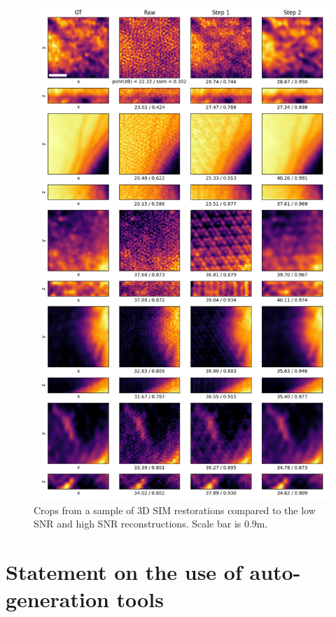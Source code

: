 \documentclass[12pt]{article}
\begin{document}
\begin{figure}[hbtp]
    \includegraphics[scale=0.65, center]{figures/m021_m022_reconstruction_samples.png}
    \caption{Crops from a sample of 3D SIM restorations compared to the low SNR and high SNR reconstructions.
    Scale bar is 0.9\textmu m.}
    \label{fig:3D_further_samples}
\end{figure}

\newpage

\section{Statement on the use of auto-generation tools}
\end{document}
